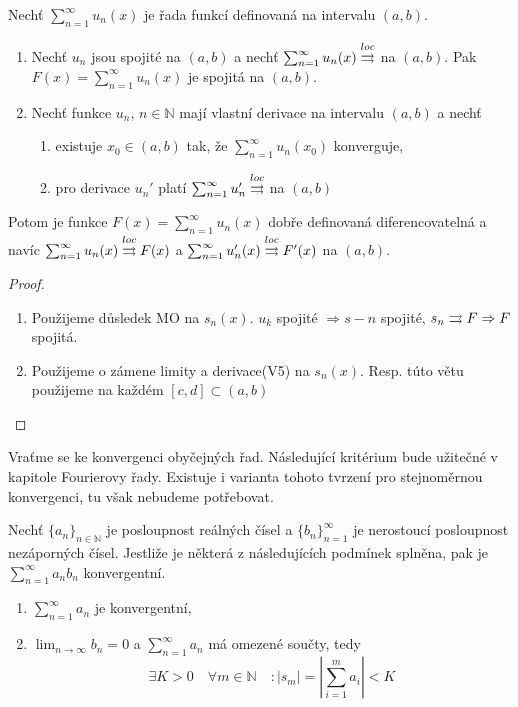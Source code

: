 \begin{vetal}
Nechť $\sum_{n=1}^{\infty} u_n (x)$ je řada funkcí definovaná na intervalu $(a,b)$.
\begin{enumerate}
\item Nechť $u_n$ jsou spojité na $(a,b)$ a nechť $\sum_{n=1}^{\infty} u_n (x) \overset{loc}{\rightrightarrows}$ na $(a,b)$. Pak $F (x) = \sum_{n=1}^{\infty} u_n (x)$ je spojitá na $(a,b)$.
\item Nechť funkce $u_n$, $n \in \mathbb{N}$ mají vlastní derivace na intervalu $(a,b)$ a nechť
	\begin{enumerate}
	\item existuje $x_0 \in (a,b)$ tak, že $\sum_{n=1}^{\infty} u_n (x_0)$ konverguje,
	\item pro derivace $u_n'$ platí $\sum_{n=1}^{\infty} u_n' \overset{loc}{\rightrightarrows}$ na $(a,b)$
	\end{enumerate}
\end{enumerate}
Potom je funkce $F(x) = \sum_{n=1}^{\infty} u_n (x)$ dobře definovaná diferencovatelná a navíc $\sum_{n=1}^{\infty} u_n (x) \overset{loc}{\rightrightarrows} F(x)$ a $\sum_{n=1}^{\infty} u'_n (x) \overset{loc}{\rightrightarrows} F'(x)$ na $(a,b)$.
\end{vetal}
\begin{proof}
\begin{enumerate}
\newline
\item Použijeme důsledek MO na $s_n(x) $. $u_k $ spojité $\Rightarrow s-n$ spojité, $s_n \rightrightarrows F \Rightarrow F$ spojitá.
\item Použijeme o zámene limity a derivace(V5) na $s_n(x)$. Resp. túto větu použijeme na každém $[c,d] \subset (a,b)$
\end{enumerate}
\end{proof}

Vraťme se ke konvergenci obyčejných řad. Následující kritérium bude užitečné v kapitole Fourierovy řady. Existuje i varianta tohoto tvrzení pro stejnoměrnou konvergenci, tu však nebudeme potřebovat.

\begin{vetat}
Nechť $\{a_n\}_{n \in \mathbb{N}}$ je posloupnost reálných čísel a $\{b_n\}_{n=1}^{\infty}$ je nerostoucí posloupnost nezáporných čísel. Jestliže je některá z následujících podmínek splněna, pak je $\sum_{n=1}^{\infty} a_n b_n$ konvergentní.
\begin{enumerate}
\item $\sum_{n=1}^{\infty} a_n$ je konvergentní,
\item $\lim_{n \rightarrow \infty} b_n = 0$ a $\sum_{n=1}^{\infty} a_n$ má omezené součty, tedy
$$\exists K > 0 \quad \forall m \in \mathbb{N} \quad : | s_m | = \left| \sum_{i=1}^{m} a_i  \right| < K$$
\end{enumerate}
\end{vetat}
